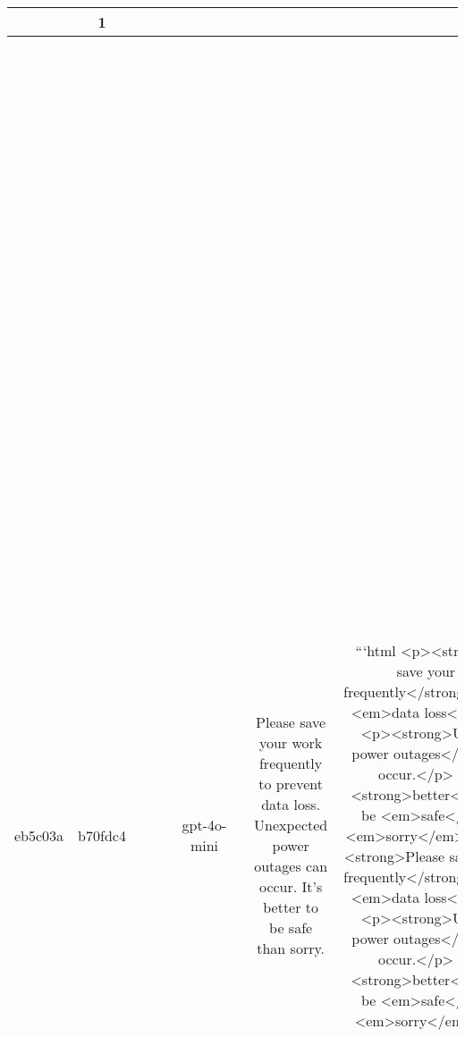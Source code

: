 \begin{table}[h!]
\begin{tabular}{|c|c|c|c|c|c|c|c|c|c|}
{{Thus, the output satisfies the outlined requirements. Therefore, there is no non-compliance with the rules provided.

OK & 1\\
\hline
eb5c03a & b70fdc4 &  &  & gpt-4o-mini & Please save your work frequently to prevent data loss. Unexpected power outages can occur. It's better to be safe than sorry. & ```html
<p><strong>Please save your work frequently</strong> to prevent <em>data loss</em>.</p>
<p><strong>Unexpected power outages</strong> can occur.</p>
<p>It's <strong>better</strong> to be <em>safe</em> than <em>sorry</em>.</p>
<p><strong>Please save your work frequently</strong> to prevent <em>data loss</em>.</p>
<p><strong>Unexpected power outages</strong> can occur.</p>
<p>It's <strong>better</strong> to be <em>safe</em> than <em>sorry</em>.</p>
``` & ok & The output contains six <p> tags. The guideline specifies that the output should have at least three <p> tags, which is satisfied in this output.

Each sentence is wrapped in a <p> tag, and within those <p> tags, there is usage of <strong> and <em> tags to emphasize key elements. This aligns with the guideline that inside each <p> tag, one <strong> tag and multiple <em> tags should be used. Each paragraph has at least one <strong> tag and at least one <em> tag, satisfying the requirement for emphasizing key words or phrases.

As none of these checks require knowledge of the input, the output adheres strictly to the guidelines provided, thus complying with the description.

No violation.
OK & 1\\
\hline
eb5c03a & b70fdc4 &  &  & gemma2:9b & Please save your work frequently to prevent data loss. Unexpected power outages can occur. It's better to be safe than sorry. & Here is the HTML code with the paragraph formatted as requested:

<p><strong>Unexpected</strong> power outages <em>can</em> <em>occur</em>.</p>
<p>It's <strong>better</strong> to be <em>safe</em> than <em>sorry</em>.</p>
<p>Please save your work frequently to prevent data loss. </p>



Let me know if you would like any further modifications or have other text you'd like formatted! 
 & err & The chatbot's output consists of three sentences each wrapped in a `<p>` tag. This satisfies the requirement that there are at least three `<p>` tags. Each `<p>` tag contains either a `<strong>` tag or multiple `<em>` tags or both, with the exception of the last `<p>` tag. The last sentence wrapped in a `<p>` tag does not contain any `<strong>` or `<em>` tags, which is a violation of the requirement that inside each `<p>` tag, there should be one `<strong>` tag and multiple `<em>` tags to emphasize key words and phrases. 

}}
\end{tabular}
\end{table}
